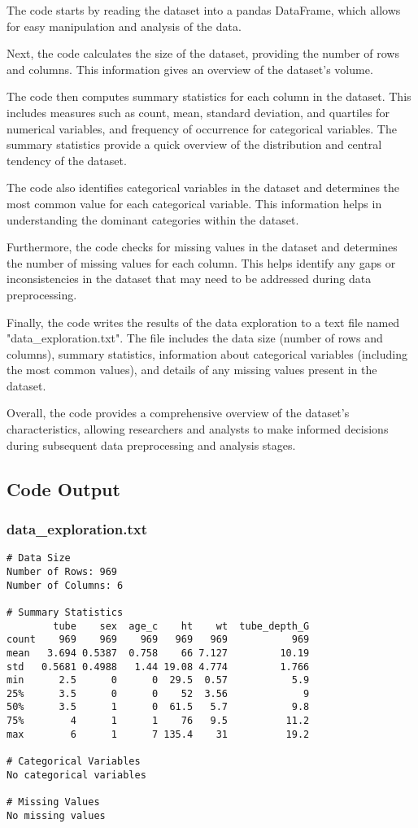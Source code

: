 \documentclass[11pt]{article}
\begin{document}
The code starts by reading the dataset into a pandas DataFrame, which allows for easy manipulation and analysis of the data. 

Next, the code calculates the size of the dataset, providing the number of rows and columns. This information gives an overview of the dataset's volume.

The code then computes summary statistics for each column in the dataset. This includes measures such as count, mean, standard deviation, and quartiles for numerical variables, and frequency of occurrence for categorical variables. The summary statistics provide a quick overview of the distribution and central tendency of the dataset.

The code also identifies categorical variables in the dataset and determines the most common value for each categorical variable. This information helps in understanding the dominant categories within the dataset.

Furthermore, the code checks for missing values in the dataset and determines the number of missing values for each column. This helps identify any gaps or inconsistencies in the dataset that may need to be addressed during data preprocessing.

Finally, the code writes the results of the data exploration to a text file named "data\_exploration.txt". The file includes the data size (number of rows and columns), summary statistics, information about categorical variables (including the most common values), and details of any missing values present in the dataset.

Overall, the code provides a comprehensive overview of the dataset's characteristics, allowing researchers and analysts to make informed decisions during subsequent data preprocessing and analysis stages.

\subsection{Code Output}

\subsubsection*{data\_exploration.txt}

\begin{Verbatim}[tabsize=4]
# Data Size
Number of Rows: 969
Number of Columns: 6

# Summary Statistics
        tube    sex  age_c    ht    wt  tube_depth_G
count    969    969    969   969   969           969
mean   3.694 0.5387  0.758    66 7.127         10.19
std   0.5681 0.4988   1.44 19.08 4.774         1.766
min      2.5      0      0  29.5  0.57           5.9
25%      3.5      0      0    52  3.56             9
50%      3.5      1      0  61.5   5.7           9.8
75%        4      1      1    76   9.5          11.2
max        6      1      7 135.4    31          19.2

# Categorical Variables
No categorical variables

# Missing Values
No missing values

\end{Verbatim}
\end{document}
